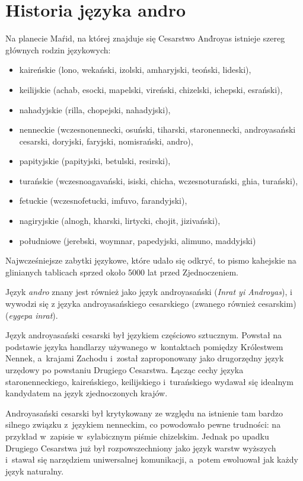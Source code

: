 \section[Historia]{Historia języka andro}

\begin{spacing}{1.1}
Na planecie Maŕid, na której znajduje się Cesarstwo And́royas istnieje szereg
głównych rodzin językowych:

\begin{itemize}
    \item kaireńskie (lono, wekański, izolski, amharyjski, teoński, lideski),
    \item keilijskie (achab, esocki, mapelski, vireński, chizelski, ichepski,
    esrański),
    \item nahadyjskie (rilla, chopejski, nahadyjski),
    \item nenneckie (wczesnonennecki, osuński, tiharski, staronennecki,
    androyasański cesarski, doryjski, faryjski, nomisrański, andro),
    \item papityjskie (papityjski, betulski, resirski),
    \item turańskie (wczesnoagavański, isiski, chicha, wczesnoturański, ghia,
    turański),
    \item fetuckie (wczesnofetucki, imfuvo, farandyjski),
    \item nagiryjskie (alnogh, kharski, lirtycki, chojit, jizivański),
    \item południowe (jerebski, woymnar, papedyjski, alimuno, maddyjski)
\end{itemize}

Najwcześniejsze zabytki językowe, które udało się odkryć, to pismo kahejskie na 
glinianych tablicach sprzed około 5000 lat przed Zjednoczeniem.

Język \emph{andro} znany jest również jako język androyasański (\emph{Inrat yi
Androyas}), i wywodzi się z języka androyasańskiego cesarskiego (zwanego również
cesarskim) (\emph{eygepa inrat}).

Język androyasański cesarski był językiem częściowo sztucznym. Powstał na
podstawie języka handlarzy używanego w~kontaktach pomiędzy Królestwem Nennek,
a~krajami Zachodu i~został zaproponowany jako drugorzędny język urzędowy po
powstaniu Drugiego Cesarstwa. Łącząc cechy języka staronenneckiego,
kaireńskiego, keilijskiego i~turańskiego wydawał się idealnym kandydatem na
język zjednoczonych krajów.

Androyasański cesarski był krytykowany ze względu na istnienie tam bardzo 
silnego związku z~językiem nenneckim, co powodowało pewne trudności: na przykład 
w~zapisie w~sylabicznym piśmie chizelskim. Jednak po upadku Drugiego Cesarstwa 
już był rozpowszechniony jako język warstw wyższych i~stawał się narzędziem 
uniwersalnej komunikacji, a~potem ewoluował jak każdy język naturalny.


\end{spacing}
